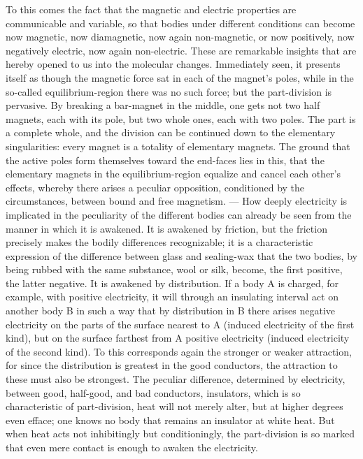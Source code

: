 \documentclass[12pt]{book}
\begin{document}
To this comes the fact that the magnetic and electric properties are communicable and
variable, so that bodies under different conditions can become now magnetic, now
diamagnetic, now again non-magnetic, or now positively, now negatively electric, now
again non-electric. These are remarkable insights that are hereby opened to us into the
molecular changes. Immediately seen, it presents itself as though the magnetic force sat
in each of the magnet's poles, while in the so-called equilibrium-region there was no
such force; but the part-division is pervasive. By breaking a bar-magnet in the middle,
one gets not two half magnets, each with its pole, but two whole ones, each with two
poles. The part is a complete whole, and the division can be continued down to the
elementary singularities: every magnet is a totality of elementary magnets. The ground
that the active poles form themselves toward the end-faces lies in this, that the
elementary magnets in the equilibrium-region equalize and cancel each other's effects,
whereby there arises a peculiar opposition, conditioned by the circumstances, between
bound and free magnetism. --- How deeply electricity is implicated in the peculiarity of
the different bodies can already be seen from the manner in which it is awakened. It is
awakened by friction, but the friction precisely makes the bodily differences
recognizable; it is a characteristic expression of the difference between glass and
sealing-wax that the two bodies, by being rubbed with the same substance, wool or silk,
become, the first positive, the latter negative. It is awakened by distribution. If a
body A is charged, for example, with positive electricity, it will through an insulating
interval act on another body B in such a way that by distribution in B there arises
negative electricity on the parts of the surface nearest to A (induced electricity of
the first kind), but on the surface farthest from A positive electricity (induced
electricity of the second kind). To this corresponds again the stronger or weaker
attraction, for since the distribution is greatest in the good conductors, the
attraction to these must also be strongest. The peculiar difference, determined by
electricity, between good, half-good, and bad conductors, insulators, which is so
characteristic of part-division, heat will not merely alter, but at higher degrees even
efface; one knows no body that remains an insulator at white heat. But when heat acts not
inhibitingly but conditioningly, the part-division is so marked that even mere contact is
enough to awaken the electricity.
\end{document}

